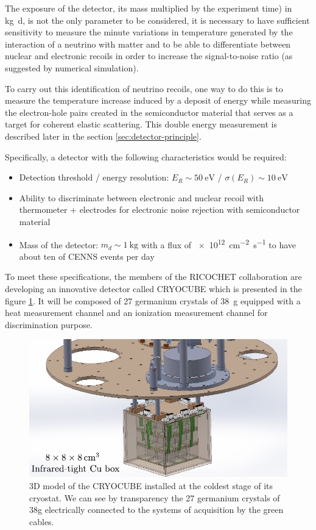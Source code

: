 The exposure of the detector, its mass multiplied by the experiment time) in \si{\kg \day}, is not the only parameter to be considered, it is necessary to have sufficient sensitivity to measure the minute variations in temperature generated by the interaction of a neutrino with matter and to be able to differentiate between nuclear and electronic recoils in order to increase the signal-to-noise ratio (as suggested by numerical simulation). 

To carry out this identification of neutrino recoils, one way to do this is to measure the temperature increase induced by a deposit of energy while measuring the electron-hole pairs created in the semiconductor material that serves as a target for coherent elastic scattering. 
This double energy measurement is described later in the section \ref{sec:detector-principle}.

Specifically, a detector with the following characteristics would be required:
\begin{itemize}
	\item Detection threshold / energy resolution: $E_R \sim \SI{50}{\eV}$ / $\sigma(E_R) \sim \SI{10}{\eV}$
	\item Ability to discriminate between electronic and nuclear recoil with thermometer + electrodes for electronic noise rejection with semiconductor material 
	\item Mass of the detector: $m_d \sim \SI{1}{\kg}$ with a flux of \SI{e12}{\cm^{-2} \s^{-1}} to have about ten of CENNS events per day
\end{itemize}

To meet these specifications, the members of the RICOCHET collaboration are developing an innovative detector called CRYOCUBE which is presented in the figure \ref{fig:cryocube}. It will be composed of 27 germanium crystals of \SI{38}{\g} equipped with a heat measurement channel and an ionization measurement channel for discrimination purpose.

\begin{figure}
\centering
\includegraphics[scale=1]{Figures/Introduction/cryocube.pdf}
\caption{3D model of the CRYOCUBE installed at the coldest stage of its cryostat. We can see by transparency the 27 germanium crystals of 38g electrically connected to the systems of acquisition by the green cables.}
\label{fig:cryocube}
\end{figure}






